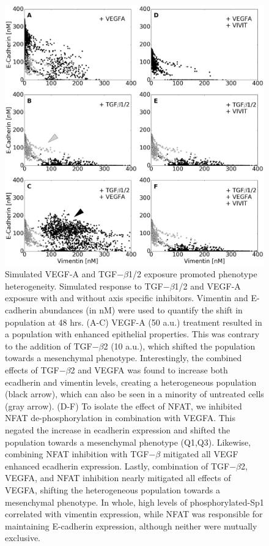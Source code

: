 \documentclass[12pt]{article}
\begin{document}
\begin{figure}
\includegraphics [width=1.0\linewidth] {./figs/Fig3_phenotype.pdf}
\caption{Simulated VEGF-A and TGF$-\beta$1/2 exposure promoted phenotype heterogeneity.
Simulated response to TGF$-\beta$1/2 and VEGF-A exposure with and without axis specific inhibitors.
Vimentin and E-cadherin abundances (in nM) were used to quantify the shift in population at 48 hrs.
(A-C) VEGF-A (50 a.u.) treatment resulted in a population with enhanced epithelial properties.
This was contrary to the addition of TGF$-\beta$2 (10 a.u.), which shifted the population towards a mesenchymal phenotype.
Interestingly, the combined effects of TGF$-\beta$2 and VEGFA was found to increase both ecadherin and vimentin levels, creating a heterogeneous population (black arrow), which can also be seen in a minority of untreated cells (gray arrow). (D-F) To isolate the effect of NFAT, we inhibited NFAT de-phosphorylation in combination with VEGFA. This negated the increase in ecadherin expression and shifted the population towards a mesenchymal phenotype (Q1,Q3).  Likewise, combining NFAT inhibition with TGF$-\beta$ mitigated all VEGF enhanced ecadherin expression.
Lastly, combination of TGF$-\beta$2, VEGFA, and NFAT inhibition nearly mitigated all effects of VEGFA, shifting the heterogeneous population towards a mesenchymal phenotype.
In whole, high levels of phosphorylated-Sp1 correlated with vimentin expression, while NFAT was responsible for maintaining E-cadherin expression, although neither were mutually exclusive.}
\label{fg:F3}
\end{figure}
\end{document}
